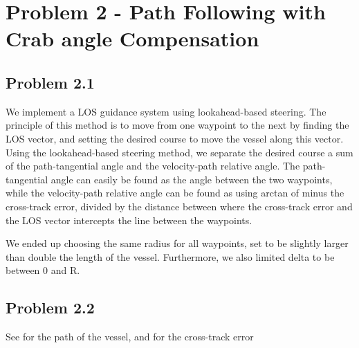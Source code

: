 \section*{Problem 2 - Path Following with Crab angle Compensation}
\subsection*{Problem 2.1}
We implement a LOS guidance system using lookahead-based steering. The principle of this method is to move from one waypoint to the next by finding the LOS vector, and setting the desired course to move the vessel along this vector. Using the lookahead-based steering method, we separate the desired course a sum of the path-tangential angle and the velocity-path relative angle. The path-tangential angle can easily be found as the angle between the two waypoints, while the velocity-path relative angle can be found as using arctan of minus the cross-track error, divided by the distance between where the cross-track error and the LOS vector intercepts the line between the waypoints. 

We ended up choosing the same radius for all waypoints, set to be slightly larger than double the length of the vessel. Furthermore, we also limited delta to be between 0 and R. 

\subsection{Problem 2.2}
See  for the path of the vessel, and  for the cross-track error 

